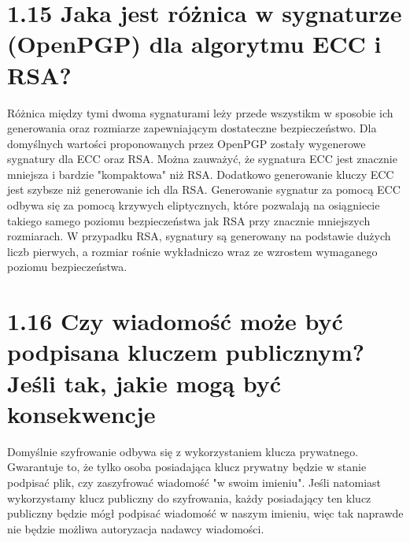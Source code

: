 \documentclass{article}
\begin{document}
\section*{1.15 Jaka jest różnica w sygnaturze (OpenPGP) dla algorytmu ECC i RSA?}

Różnica między tymi dwoma sygnaturami leży przede wszystikm w sposobie ich generowania oraz rozmiarze zapewniającym dostateczne bezpieczeństwo.
Dla domyślnych wartości proponowanych przez OpenPGP zostały wygenerowe sygnatury dla ECC oraz RSA. Można zauważyć, że sygnatura ECC jest znacznie mniejsza i bardzie "kompaktowa" niż RSA.
Dodatkowo generowanie kluczy ECC jest szybsze niż generowanie ich dla RSA. Generowanie sygnatur za pomocą ECC odbywa się za pomocą krzywych eliptycznych, które pozwalają na osiągniecie takiego samego poziomu bezpieczeństwa
jak RSA przy znacznie mniejszych rozmiarach. W przypadku RSA, sygnatury są generowany na podstawie dużych liczb pierwych, a rozmiar rośnie wykładniczo wraz ze wzrostem wymaganego poziomu bezpieczeństwa.

\section*{1.16 Czy wiadomość może być podpisana kluczem publicznym? Jeśli tak, jakie mogą
  być konsekwencje}

Domyślnie szyfrowanie odbywa się z wykorzystaniem klucza prywatnego. Gwarantuje to, że tylko osoba posiadająca klucz prywatny będzie w stanie podpisać plik, czy zaszyfrować wiadomość "w swoim imieniu".
Jeśli natomiast wykorzystamy klucz publiczny do szyfrowania, każdy posiadający ten klucz publiczny będzie mógł podpisać wiadomość w naszym imieniu, więc tak naprawde nie będzie możliwa autoryzacja
nadawcy wiadomości.
\end{document}
